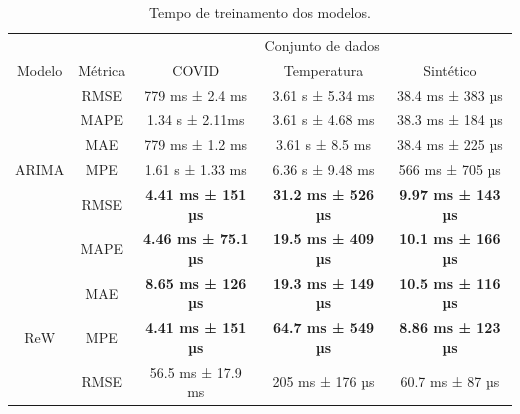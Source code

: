 \begin{table}[htbp]
    \caption{Tempo de treinamento dos modelos.}\label{tab:tempo_ajuste}
    \centering
    \begin{tabular}{@{}ccccc@{}} \toprule
                                  &                           & \multicolumn{3}{c}{Conjunto de dados}                                                                                       \\ \cmidrule{3-5}
        \multirow{-2}{*}{Modelo}  & \multirow{-2}{*}{Métrica} & \multicolumn{1}{c}{COVID}                      & \multicolumn{1}{c}{Temperatura}               & Sintético                 \\ \midrule
                                  & RMSE                      & \multicolumn{1}{c}{779 ms ± 2.4 ms}            & \multicolumn{1}{c}{3.61 s ± 5.34 ms}          & 38.4 ms ± 383 µs          \\
                                  & MAPE                      & \multicolumn{1}{c}{1.34 s ± 2.11ms}            & \multicolumn{1}{c}{3.61 s ± 4.68 ms}          & 38.3 ms ± 184 µs          \\
                                  & MAE                       & \multicolumn{1}{c}{779 ms ± 1.2 ms}            & \multicolumn{1}{c}{3.61 s ± 8.5 ms}           & 38.4 ms ± 225 µs          \\
        \multirow{-4}{*}{ARIMA}   & MPE                       & \multicolumn{1}{c}{1.61 s ± 1.33 ms}           & \multicolumn{1}{c}{6.36 s ± 9.48 ms}          & 566 ms ± 705 µs           \\ \midrule
                                  & RMSE                      & \multicolumn{1}{c}{\textbf{4.41 ms ± 151 µs}}  & \multicolumn{1}{c}{\textbf{31.2 ms ± 526 µs}} & \textbf{9.97 ms ± 143 µs} \\
                                  & MAPE                      & \multicolumn{1}{c}{\textbf{4.46 ms ± 75.1 µs}} & \multicolumn{1}{c}{\textbf{19.5 ms ± 409 µs}} & \textbf{10.1 ms ± 166 µs} \\
                                  & MAE                       & \multicolumn{1}{c}{\textbf{8.65 ms ± 126 µs}}  & \multicolumn{1}{c}{\textbf{19.3 ms ± 149 µs}} & \textbf{10.5 ms ± 116 µs} \\
        \multirow{-4}{*}{ReW}     & MPE                       & \multicolumn{1}{c}{\textbf{4.41 ms ± 151 µs}}  & \multicolumn{1}{c}{\textbf{64.7 ms ± 549 µs}} & \textbf{8.86 ms ± 123 µs} \\ \midrule
                                  & RMSE                      & \multicolumn{1}{c}{56.5 ms ± 17.9 ms}          & \multicolumn{1}{c}{205 ms ± 176 µs}           & 60.7 ms ± 87 µs           \\

\end{tabular}
\end{table}
